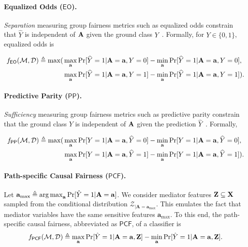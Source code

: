 \paragraph{Equalized Odds ($ \mathsf{EO} $).} \textit{Separation} measuring group fairness metrics such as equalized odds constrain that $ \widehat{Y} $ is independent of $ \mathbf{A} $ given the ground class $ Y $~\cite{hardt2016equality}.  Formally, for $ Y \in \{0,1\} $, equalized odds is 

\begin{align*}
	f_{\mathsf{EO}}(\mathcal{M}, \mathcal{D})  \triangleq \max(&\max_{\mathbf{a}}\Pr[\widehat{Y} =1 | \mathbf{A} = \mathbf{a}, Y = 0] - \min_{\mathbf{a}}\Pr[\widehat{Y} =1 | \mathbf{A} = \mathbf{a}, Y = 0], \\ &\max_{\mathbf{a}}\Pr[\widehat{Y} =1 | \mathbf{A} = \mathbf{a}, Y = 1] - \min_{\mathbf{a}}\Pr[\widehat{Y} =1 | \mathbf{A} = \mathbf{a}, Y = 1]).
\end{align*} 
	
	
\paragraph{Predictive Parity ($ \mathsf{PP} $).} \textit{Sufficiency} measuring group fairness metrics such as predictive parity constrain that the ground class $ Y $ is independent of $ \mathbf{A} $ given the prediction $ \widehat{Y} $~\cite{verma2018fairness}. Formally, 

\begin{align*}
	f_{\mathsf{PP}}(\mathcal{M}, \mathcal{D})  \triangleq \max(&\max_{\mathbf{a}}\Pr[Y =1 | \mathbf{A} = \mathbf{a}, \widehat{Y} = 0] - \min_{\mathbf{a}}\Pr[Y =1 | \mathbf{A} = \mathbf{a}, \widehat{Y} = 0], \\&\max_{\mathbf{a}}\Pr[Y =1 | \mathbf{A} = \mathbf{a}, \widehat{Y} = 1] - \min_{\mathbf{a}}\Pr[Y =1 | \mathbf{A} = \mathbf{a}, \widehat{Y} = 1]).
\end{align*}

\paragraph{Path-specific Causal Fairness ($ \mathsf{PCF} $).}
Let $ \mathbf{a}_{\max}  \triangleq \operatorname*{arg\,max}_{ \mathbf{a}} \Pr[\hat{Y} =1 |\mathbf{A}=  \mathbf{a}] $. We consider mediator features $ \mathbf{Z} \subseteq \mathbf{X} $ sampled from the conditional distribution $ {\mathcal{Z}_{|\mathbf{A} = \mathbf{a}_{\max}}} $. This emulates the fact that mediator variables have the same sensitive features $ \mathbf{a}_{\max} $.   To this end, the path-specific causal fairness, abbreviated as $ \mathsf{PCF} $, of a classifier is \[
f_{\mathsf{PCF}}(\mathcal{M}, \mathcal{D}) \triangleq \max_{\mathbf{a}}\Pr[\hat{Y} = 1 | \mathbf{A} =  \mathbf{a}, \mathbf{Z}] - \min_{\mathbf{a}} \Pr[\hat{Y} = 1 | \mathbf{A} = \mathbf{a}, \mathbf{Z} ].
\]



